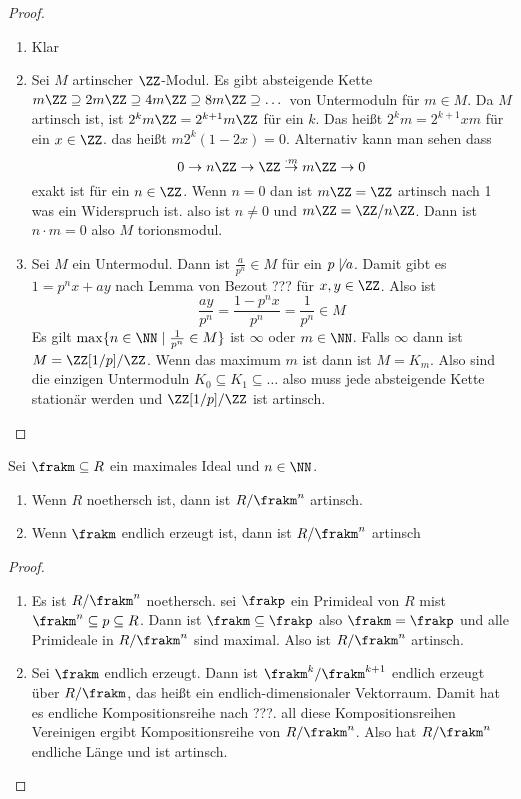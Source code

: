 \begin{proof}
	\begin{enumerate}
		\item Klar
		\item Sei \(M\) artinscher \(\ZZ\)-Modul. Es gibt absteigende Kette \(m\ZZ\supseteq 2m\ZZ\supseteq 4m\ZZ\supseteq 8m\ZZ\supseteq\dots\) von Untermoduln für \(m\in M\).
		Da \(M\) artinsch ist, ist \(2^km\ZZ=2^{k+1}m\ZZ\) für ein \(k\).
		Das heißt \(2^km=2^{k+1}xm\) für ein \(x\in\ZZ\).
		das heißt \(m2^k(1-2x)=0\). 
		Alternativ kann man sehen dass 
		\[0\to n\ZZ\to \ZZ\stackrel{\cdot m}\to m\ZZ\to 0\] exakt ist für ein \(n\in\ZZ\).
		Wenn \(n=0\) dan ist \(m\ZZ=\ZZ\) artinsch nach 1 was ein Widerspruch ist. also ist \(n\neq0\) und \(m\ZZ=\ZZ/n\ZZ\). Dann ist \(n\cdot m=0\) also \(M\) torionsmodul.
		\item Sei \(M\) ein Untermodul. Dann ist \(\frac{a}{p^n}\in M\) für ein \(p\not\mid a\). Damit gibt es \(1=p^nx+ay\) nach Lemma von Bezout ??? für \(x,y\in\ZZ\). Also ist 
		\[\frac{ay}{p^n}=\frac{1-p^nx}{p^n}=\frac{1}{p^n}\in M\]
		Es gilt \(\max\{n\in\NN\mid \frac{1}{p^n}\in M\}\) ist \(\infty\) oder \(m\in\NN\).
		Falls \(\infty\) dann ist \(M=\ZZ[1/p]/\ZZ\).
		Wenn das maximum \(m\) ist dann ist \(M=K_m\).
		Also sind die einzigen Untermoduln \(K_0\subseteq K_1\subseteq\dots\) also muss jede absteigende Kette stationär werden und \(\ZZ[1/p]/\ZZ\) ist artinsch.
	\end{enumerate}
\end{proof}
\begin{Lemma}
	Sei \(\frakm\subseteq R\) ein maximales Ideal und \(n\in\NN\).
	\begin{enumerate}
		\item Wenn \(R\) noethersch ist, dann ist \(R/\frakm^n\) artinsch.
		\item Wenn \(\frakm\) endlich erzeugt ist, dann ist \(R/\frakm^n\) artinsch
	\end{enumerate}
\end{Lemma}
\begin{proof}
	\begin{enumerate}
		\item Es ist \(R/\frakm^n\) noethersch. sei \(\frakp\) ein Primideal von \(R\) mist \(\frakm^n\subseteq p\subseteq R\).
		Dann ist \(\frakm\subseteq \frakp\) also \(\frakm=\frakp\) und alle Primideale in \(R/\frakm^n\) sind maximal. Also ist \(R/\frakm^n\) artinsch.
		\item Sei \(\frakm\) endlich erzeugt. Dann ist \(\frakm^k/\frakm^{k+1}\) endlich erzeugt über \(R/\frakm\), das heißt ein endlich-dimensionaler Vektorraum. Damit hat es endliche Kompositionsreihe nach ???.
		all diese Kompositionsreihen Vereinigen ergibt Kompositionsreihe von \(R/\frakm^n\). Also hat \(R/\frakm^n\) endliche Länge und ist artinsch.
	\end{enumerate}
\end{proof}

